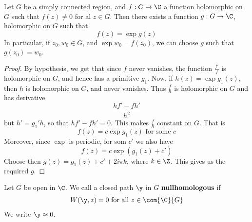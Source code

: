 \begin{corollary}
    Let $G$ be a simply connected region, and  $f:G \xrightarrow{} \C$ a
    function holomorphic on $G$ such that  $f(z) \neq 0$ for al $z \in G$. Then
    there exists a function  $g:G \xrightarrow{} \C$, holomorphic on $G$ such that
    \begin{equation*}
        f(z)=\exp{g(z)}
    \end{equation*}
    In particular, if $z_0,w_0 \in G$, and $\exp{w_0}=f(z_0)$, we can choose $g$
    such that $g(z_0)=w_0$.
\end{corollary}
\begin{proof}
    By hypothesis, we get that since $f$ never vanishes, the function
    $\frac{f'}{f}$ is holomorphic on $G$, and hence has a primitive $g_1$. Now, if
    $h(z)=\exp{g_1(z)}$, then $h$ is holomorphic on  $G$, and never vanishes. Thus
     $\frac{f}{h}$ is holomorphic on $G$ and has derivative
     \begin{equation*}
         \frac{hf'-fh'}{h^2}
     \end{equation*}
     but $h'=g_1'h$, so that $hf'-fh'=0$. This makes  $\frac{f}{h}$ constant on
     $G$. That is
     \begin{equation*}
         f(z)=c\exp{g_1(z)} \text{ for some } c
     \end{equation*}
     Moreover, since $\exp$ is periodic, for som  $c'$ we also have
     \begin{equation*}
         f(z)=c\exp{(g_1(z)+c')}
     \end{equation*}
     Choose then $g(z)=g_1(z)+c'+2i\pi{k}$, where $k \in \Z$. This gives us the
     required $g$.
\end{proof}

\begin{definition}
    Let $G$ be open in $\C$. We call a closed path $\y$ in $G$
    \textbf{nullhomologous} if
    \begin{equation*}
        W(\y,z)=0 \text{ for all } z \in \com{\C}{G}
    \end{equation*}
    We write
    $\y \approx 0$.
\end{definition}
